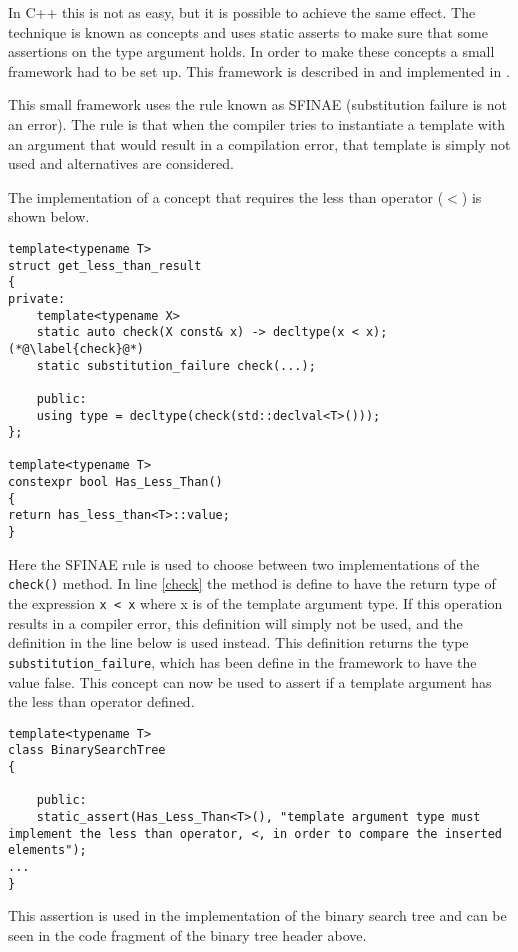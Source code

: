 In C++ this is not as easy, but it is possible to achieve the same effect.
The technique is known as concepts and uses static asserts to make sure that some assertions on the type argument holds. \cite[p.~708]{stroustrup2013c++}
In order to make these concepts a small framework had to be set up. 
This framework is described in \citet[p.~800]{stroustrup2013c++} and implemented in .

This small framework uses the rule known as SFINAE (substitution failure is not an error).
The rule is that when the compiler tries to instantiate a template with an argument that would result in a compilation error, that template is simply not used and alternatives are considered\cite[p.~692]{stroustrup2013c++}.

The implementation of a concept that requires the less than operator ($ < $) is shown below.

\begin{lstlisting}
template<typename T>
struct get_less_than_result
{
private:
	template<typename X>
 	static auto check(X const& x) -> decltype(x < x); (*@\label{check}@*)
	static substitution_failure check(...);
	
	public:
	using type = decltype(check(std::declval<T>()));
};

template<typename T>
constexpr bool Has_Less_Than()
{
return has_less_than<T>::value;
}
\end{lstlisting}

Here the SFINAE rule is used to choose between two implementations of the \lstinline|check()| method.
In line \ref{check} the method is define to have the return type of the expression \lstinline|x < x| where x is of the template argument type.
If this operation results in a compiler error, this definition will simply not be used, and the definition in the line below is used instead.
This definition returns the type \lstinline|substitution_failure|, which has been define in the framework to have the value false.
This concept can now be used to assert if a template argument has the less than operator defined.

\begin{lstlisting}
template<typename T>
class BinarySearchTree
{

	public:
	static_assert(Has_Less_Than<T>(), "template argument type must implement the less than operator, <, in order to compare the inserted elements");
...
}
\end{lstlisting}

This assertion is used in the implementation of the binary search tree and can be seen in the code fragment of the binary tree header above.

